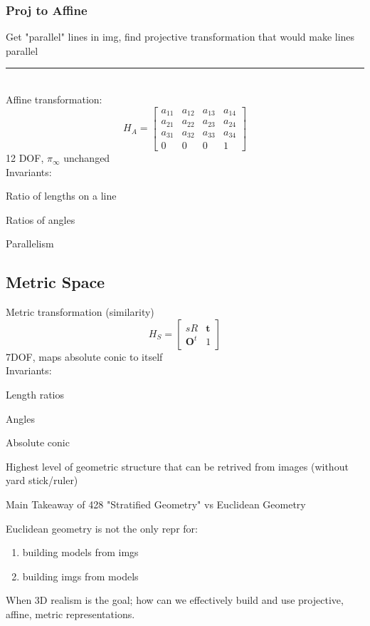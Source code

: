 \documentclass{article}
\begin{document}
\subsubsection{Proj to Affine}
Get "parallel" lines in img, find projective transformation that would make 
lines parallel\\[5pt]
\noindent\rule{\textwidth}{0.5pt}
\\[15pt]
Affine transformation:
\[
  H_A = \begin{bmatrix}
    a_{11} & a_{12} & a_{13} & a_{14} \\
    a_{21} & a_{22} & a_{23} & a_{24}\\
    a_{31} & a_{32} & a_{33} & a_{34} \\
    0 & 0 & 0 & 1
  \end{bmatrix}
\]
12 DOF, $\pi_\infty$ unchanged
\\
Invariants:
\begin{list}{}{}
  \item Ratio of lengths on a line
  \item Ratios of angles
  \item Parallelism
\end{list}

\subsection{Metric Space}
Metric transformation (similarity)
\[
  H_S = \begin{bmatrix}
    sR & \mathbf t\\
    \mathbf O^t & 1
  \end{bmatrix}
\]
7DOF, maps absolute conic to itself
\\
Invariants:
\begin{list}{}{}
  \item Length ratios
  \item Angles
  \item Absolute conic
\end{list}
Highest level of geometric structure that can be retrived from images 
(without yard stick/ruler)

\begin{ovr}
  {Main Takeaway of 428}{}
  "Stratified Geometry" vs Euclidean Geometry
\end{ovr}
\noindent
Euclidean geometry is not the only repr for:
\begin{enumerate}
  \item building models from imgs
  \item building imgs from models
\end{enumerate}
When 3D realism is the goal; how can we effectively build and use projective,
affine, metric representations.
\end{document}
